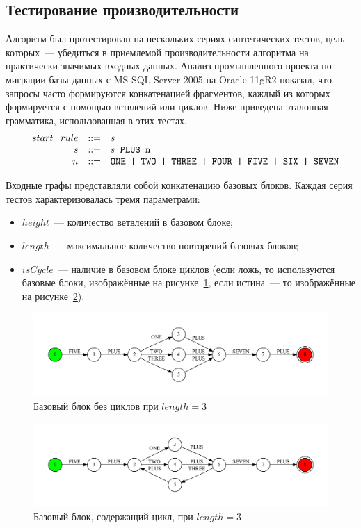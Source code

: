 \subsection{Тестирование производительности}
Алгоритм был протестирован на нескольких сериях синтетических тестов, цель которых~--- убедиться в приемлемой производительности алгоритма на практически значимых входных данных. Анализ промышленного проекта по миграции базы данных с MS-SQL Server 2005 на Oraclе 11gR2 показал, что запросы часто формируются конкатенацией фрагментов, каждый из которых формируется с помощью ветвлений или циклов. Ниже приведена эталонная грамматика, использованная в этих тестах. 
$$
\begin{array}{crcl}
& start\_rule &::=& s \\
& s & ::= & s \mbox{\texttt{ PLUS }} \mbox{\texttt{n}}\\
& n & ::= & \mbox{\texttt{ONE | }} \mbox{\texttt{TWO | }} \mbox{\texttt{THREE | }} \mbox{\texttt{FOUR | }} \mbox{\texttt{FIVE | }} \mbox{\texttt{SIX | }} \mbox{\texttt{SEVEN}}
\end{array}
$$

Входные графы представляли собой конкатенацию базовых блоков. Каждая серия тестов характеризовалась тремя параметрами: 
\begin{itemize}
  \item $height$~--- количество ветвлений в базовом блоке;
  \item $length$~--- максимальное количество повторений базовых блоков;
  \item $isCycle$~--- наличие в базовом блоке циклов (если ложь, то используются базовые блоки, изображённые на рисунке~\ref{block}, если истина~--- то изображённые на рисунке~\ref{block_loop}).
\end{itemize}

\begin{figure}[h!]
 \centering
 \includegraphics[width=15cm]{pics/block.pdf}
 \caption{Базовый блок без циклов при $length=3$}
 \label{block}
\end{figure}

\begin{figure}[h!]
 \centering
 \includegraphics[width=15cm]{pics/block_loop.pdf}
 \caption{Базовый блок, содержащий цикл, при $length=3$}
 \label{block_loop}
\end{figure}

